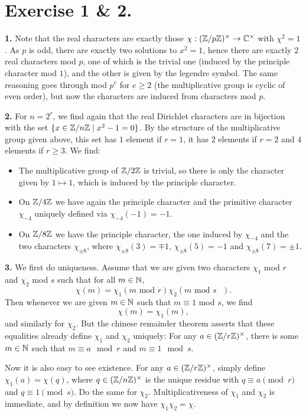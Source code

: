 \documentclass[a4paper,11pt]{article}
\begin{document}
\section*{Exercise 1 \& 2.}
\textbf{1.} Note that the real characters are exactly those $\chi:
(\mathbb{Z}/p\mathbb{Z})^\times \to \mathbb{C}^\times$  with $\chi^2 = 1$.
As $p$ is odd, there are exactly two solutions to $x^2=1$, hence there are exactly
$2$ real characters mod $p$, one of which is the trivial
one (induced by the principle character mod $1$), and the other is given by the 
legendre symbol. The same reasoning goes through mod $p^e$ for $e \geq 2$ (the
multiplicative group is cyclic of even order), but now the characters are
induced from characters mod $p$.

\textbf{2.}
For $n = 2^r$, we find again that the real Dirichlet characters are in
bijection with the set $\{x \in \mathbb{Z}/n\mathbb{Z} \mid x^2 -1 = 0\}$. By the structure of the 
multiplicative group given above, this set has $1$ element if $r=1$, it has $2$
elements if $r = 2$ and $4$ elements if $r \geq 3$. We find:
\begin{itemize}
    \item The multiplicative group of $\mathbb{Z}/2\mathbb{Z}$ is trivial, so there is only the
        character given by $1 \mapsto 1$, which is induced by the principle
        character. 
    \item On $\mathbb{Z}/4\mathbb{Z}$ we have again the principle character and the primitive
        character $\chi_{-4}$ uniquely defined via $\chi_{-4}(-1) = -1$.
    \item On $\mathbb{Z}/8\mathbb{Z}$ we have the principle character, the one induced by $\chi_{-4}$ 
        and the two characters $\chi_{\pm 8}$, where $\chi_{\pm 8}(3) = \mp 1$, 
        $\chi_{\pm 8}(5) = -1$ and $\chi_{\pm 8}(7) = \pm 1$. 
\end{itemize}

\textbf{3.} 
We first do uniqueness. Assume that we are given two characters $\chi_1$ mod $r$ 
and $\chi_2$ mod $s$ such that for all $m \in \mathbb{N}$, 
\[
    \chi(m) = \chi_1(m \text{ mod $r$}) \chi_2(m \text{ mod $s$ }).
\]
Then whenever we are given $m \in \mathbb{N}$ such that $m \equiv 1$ mod $s$, we find 
\[
    \chi(m) = \chi_1(m),
\]
and similarly for $\chi_2$. But the chinese remainder theorem asserts that
these equalities already define $\chi_1$ and $\chi_2$ uniquely: For any $a \in
(\mathbb{Z}/r\mathbb{Z})^\times$, there is some $m \in \mathbb{N}$ such that $m \equiv a \mod r$ and 
$m \equiv 1 \mod s$. 

Now it is also easy to see existence. For any $a \in (\mathbb{Z}/r\mathbb{Z})^\times$, simply define
$\chi_1(a) = \chi(q)$, where $q \in (\mathbb{Z}/n\mathbb{Z})^\times$ is the unique residue with
$q \equiv a \pmod r$ and $q \equiv 1 \pmod s$. Do the same for $\chi_2$.
Multiplicativeness of $\chi_1$ and $\chi_2$ is immediate, and
by definition we now have $\chi_1 \chi_2 = \chi$. 
\end{document}
